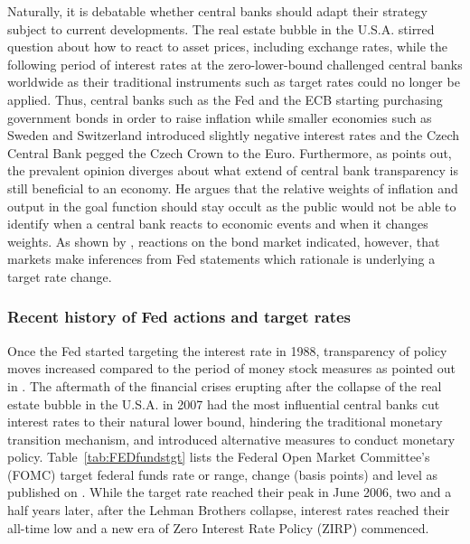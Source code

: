 Naturally, it is debatable whether central banks should adapt their strategy subject to current developments. The real estate bubble in the U.S.A. stirred question about how to react to asset prices, including exchange rates, while the following period of interest rates at the zero-lower-bound challenged central banks worldwide as their traditional instruments such as target rates could no longer be applied. Thus, central banks such as the Fed and the ECB starting purchasing government bonds in order to raise inflation while smaller economies such as Sweden and Switzerland introduced slightly negative interest rates and the Czech Central Bank pegged the Czech Crown to the Euro. Furthermore, as \textcite{Mishkin.2007} points out, the prevalent opinion diverges about what extend of central bank transparency is still beneficial to an economy. He argues that the relative weights of inflation and output in the goal function should stay occult as the public would not be able to identify when a central bank reacts to economic events and when it changes weights. As shown by \textcite{Ellingsen.2001}, reactions on the bond market indicated, however, that markets make inferences from Fed statements which rationale is underlying a target rate change. %


\subsubsection{Recent history of Fed actions and target rates}

Once the Fed started targeting the interest rate in 1988, transparency of policy moves increased compared to the period of money stock measures as pointed out in \textcite{Ellingsen.2003}. The aftermath of the financial crises erupting after the collapse of the real estate bubble in the U.S.A. in 2007 had the most influential central banks cut interest rates to their natural lower bound, hindering the traditional monetary transition mechanism, and introduced alternative measures to conduct monetary policy. Table~\vref{tab:FEDfundstgt} lists the Federal Open Market Committee's (FOMC) target federal funds rate or range, change (basis points) and level as published on \textcite{Fed.OMOs}. While the target rate reached their peak in June 2006, two and a half years later, after the Lehman Brothers collapse, interest rates reached their all-time low and a new era of Zero Interest Rate Policy (ZIRP) commenced.

